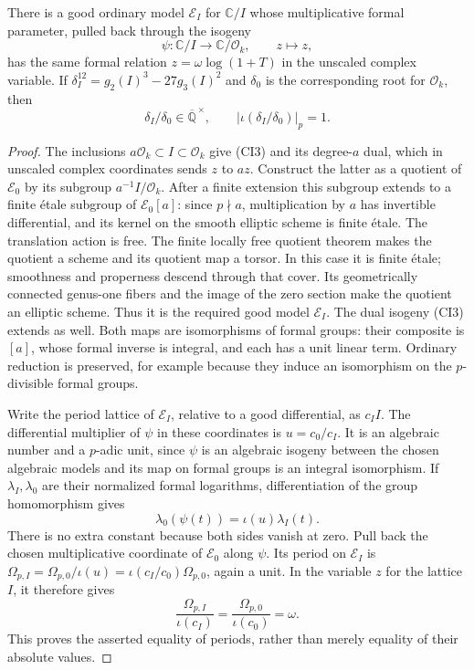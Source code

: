 \begin{proposition}\label{ci-common-period}
There is a good ordinary model $\mathscr E_I$ for
$\mathbb C/I$ whose multiplicative formal parameter, pulled
back through the isogeny
\[
                    \psi:\mathbb C/I\longrightarrow
                         \mathbb C/\mathcal O_k,\qquad z\longmapsto z,
 \tag{CI3}
\]
has the same formal relation $z=\omega\log(1+T)$
in the unscaled complex variable.
If $\delta_I^{12}=g_2(I)^3-27g_3(I)^2$ and $\delta_0$
is the corresponding root for $\mathcal O_k$, then
\[
 \delta_I/\delta_0\in\overline{\mathbb Q}^{\,\times},
       \qquad |\iota(\delta_I/\delta_0)|_p=1.
 \tag{CI4}
\]
\end{proposition}
\begin{proof}
The inclusions $a\mathcal O_k\subset I\subset\mathcal O_k$
give (CI3) and its degree-$a$ dual, which in unscaled complex
coordinates sends $z$ to $az$.
Construct the latter as a quotient of $\mathscr E_0$ by its
subgroup $a^{-1}I/\mathcal O_k$.
After a finite extension this subgroup extends to a finite
\'etale subgroup of $\mathscr E_0[a]$: since $p\nmid a$,
multiplication by $a$ has invertible differential, and its
kernel on the smooth elliptic scheme is finite \'etale.
The translation action is free.  The finite locally free
quotient theorem \cite{stacks-07S7} makes the quotient a scheme
and its quotient map a torsor.  In this case it is finite
\'etale; smoothness and properness descend through that
cover.  Its geometrically connected genus-one fibers and
the image of the zero section make the quotient an elliptic
scheme.  Thus it is the required good model $\mathscr E_I$.
The dual isogeny (CI3) extends as well.  Both maps are
isomorphisms of formal groups: their composite is $[a]$,
whose formal inverse is integral, and each has a unit
linear term.  Ordinary reduction is preserved, for example
because they induce an isomorphism on the $p$-divisible
formal groups.

Write the period lattice of $\mathscr E_I$, relative to a
good differential, as $c_I I$.
The differential multiplier of $\psi$ in these coordinates
is $u=c_0/c_I$.  It is an algebraic number and a $p$-adic
unit, since $\psi$ is an algebraic isogeny between the
chosen algebraic models and its map on formal groups is an
integral isomorphism.
If $\lambda_I,\lambda_0$ are their normalized formal
logarithms, differentiation of the group homomorphism gives
\[
               \lambda_0(\psi(t))=\iota(u)\lambda_I(t).
 \tag{CI5}
\]
There is no extra constant because both sides vanish at zero.
Pull back the chosen multiplicative coordinate of
$\mathscr E_0$ along $\psi$.  Its period on $\mathscr E_I$
is
$\Omega_{p,I}=\Omega_{p,0}/\iota(u)
=\iota(c_I/c_0)\Omega_{p,0}$, again a unit.
In the variable $z$ for the lattice $I$, it therefore gives
\[
             \frac{\Omega_{p,I}}{\iota(c_I)}
                       =\frac{\Omega_{p,0}}{\iota(c_0)}=\omega.
 \tag{CI6}
\]
This proves the asserted equality of periods, rather than
merely equality of their absolute values.


\end{proof}
